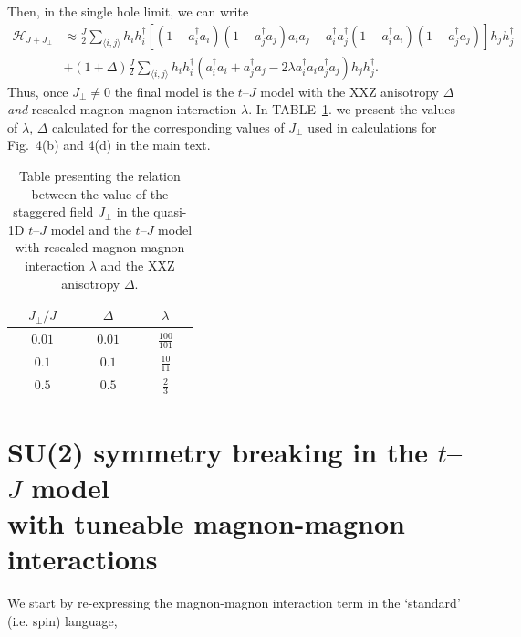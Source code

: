 \documentclass[%
 reprint,
 amsmath,amssymb,
 aps,
prl,
]{revtex4-1}
\newcommand{\mean}[1]{\langle#1\rangle}
\begin{document}
Then, in the single hole limit, we can write
%
\begin{equation}
	\begin{aligned}
	\mathcal{H}_{J+J_\perp} 
	&\approx \frac{J}{2}\sum_{\mean{i,j}} h_i h_i^\dag \left[(1 - a_i^\dag a_i)(1 - a_j^\dag a_j)a_i a_j + a_i^\dag a_j^\dag (1 - a_i^\dag a_i)(1 - a_j^\dag a_j) \right] h_j h_j^\dag  \\
	&+ (1+\Delta) \frac{J}{2} \sum_{\mean{i,j}} h_i h_i^\dag \left(a_i^\dag a_i + a_j^\dag a_j - 2\lambda a_i^\dag a_i a_j^\dag a_j \right) h_j h_j^\dag.
	\end{aligned}
\end{equation}
%
Thus, once  $J_\perp \neq 0$ the final model is the $t$--$J$ model with the XXZ anisotropy $\Delta$ 
{\it and} rescaled magnon-magnon interaction $\lambda$. In TABLE~\ref{tab:params}. 
we present the values of $\lambda$, $\Delta$ calculated for the corresponding values of $J_\perp$ 
used in calculations for Fig.~4(b) and 4(d) in the main text.

\begin{table}[t!]
	\begin{center}
	\begin{tabular}{|| c || c | c ||} 
		\hline
		 ~~$J_\perp / J$~~ & ~~$\Delta$~~ & ~~$\lambda$~~ \\
		\hline\hline
		 ~~$0.01$~~ & ~~$0.01$~~ & ~~$\frac{100}{101}$~~ \\  
		\hline
		 $0.1$ & $0.1$ & $\frac{10}{11}$ \\ 
		\hline
		$0.5$ & $0.5$ & $\frac{2}{3}$ \\
		\hline
	\end{tabular}
	\end{center}
	\caption{Table presenting the relation between the value of the staggered field $J_\perp$ in the quasi-1D $t$--$J$ model and the $t$--$J$ model 
	with rescaled magnon-magnon interaction $\lambda$ and the XXZ anisotropy $\Delta$.}
	\label{tab:params}
\end{table}

\section{SU(2) symmetry breaking in the $t$--$J$ model \\ with tuneable magnon-magnon interactions}

We start by re-expressing the magnon-magnon interaction term in the `standard' (i.e. spin) language,
\end{document}
